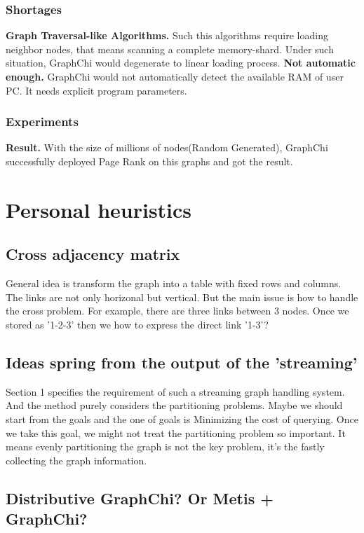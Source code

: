 \documentclass{article}
\begin{document}
	\subsubsection{Shortages}
	\textbf{Graph Traversal-like Algorithms.} Such this algorithms require loading neighbor nodes, that means scanning a complete memory-shard. Under such situation, GraphChi would degenerate to linear loading process.
	\textbf{Not automatic enough.} GraphChi would not automatically detect the available RAM of user PC. It needs explicit program parameters.
	\subsubsection{Experiments}
	\textbf{Result.} With the size of millions of nodes(Random Generated), GraphChi successfully deployed Page Rank\cite{pagerank} on this graphs and got the result.

	\newpage
	\section{Personal heuristics}
	\subsection{Cross adjacency matrix}
	General idea is transform the graph into a table with fixed rows and columns. The links are not only horizonal but vertical. But the main issue is how to handle the cross problem. For example, there are three links between 3 nodes. Once we stored as '1-2-3' then we how to express the direct link '1-3'?

	\subsection{Ideas spring from the output of the 'streaming'}
	Section 1 specifies the requirement of such a streaming graph handling system. And the method\cite{stanton2012streaming} purely considers the partitioning problems. Maybe we should start from the goals and the one of goals is Minimizing the cost of querying. Once we take this goal, we might not treat the partitioning problem so important. It means evenly partitioning the graph is not the key problem, it's the fastly collecting the graph information.

	\subsection{Distributive GraphChi? Or Metis + GraphChi?}
\end{document}

